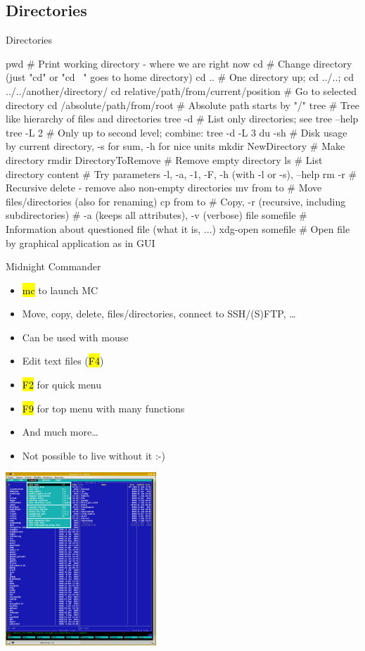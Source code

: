 \documentclass[compress, ucs, xelatex, 11pt, xcolor=svgnames,
  hyperref={
    bookmarks=true,
    unicode=true,
    colorlinks=true,
    pdftitle={Linux, command line and MetaCentrum},
    plainpages=false,
    pdfauthor={Vojtech Zeisek},
    pdfsubject={Course about use of Linux command line, writing shell scripts and using MetaCentrum of CESNET},
    pdfcreator={XeLaTeX},
    pdfkeywords={Linux, GNU, BASH, shell, command line, MetaCentrum},
    linkcolor=Red,
    anchorcolor=Blue,
    citecolor=Purple,
    filecolor=DodgerBlue,
    menucolor=DarkOrchid,
    urlcolor=DeepSkyBlue,
    pdftex},
  url={hyphens, lowtilde} %
  ]{beamer}
\renewcommand{\texttt}[1]{\hl{\ttfamily #1}}
\begin{document}
\subsection{Directories}

\begin{frame}[fragile]{Directories}
  \begin{bashcode}
    pwd # Print working directory - where we are right now
    cd # Change directory (just "cd" or "cd ~" goes to home directory)
    cd .. # One directory up; cd ../..; cd ../../another/directory/
    cd relative/path/from/current/position # Go to selected directory
    cd /absolute/path/from/root # Absolute path starts by "/"
    tree # Tree like hierarchy of files and directories
    tree -d # List only directories; see tree --help
    tree -L 2 # Only up to second level; combine: tree -d -L 3
    du -sh # Disk usage by current directory, -s for sum, -h for nice units
    mkdir NewDirectory # Make directory
    rmdir DirectoryToRemove # Remove empty directory
    ls # List directory content
       # Try parameters -l, -a, -1, -F, -h (with -l or -s), --help
    rm -r # Recursive delete - remove also non-empty directories
    mv from to # Move files/directories (also for renaming)
    cp from to # Copy, -r (recursive, including subdirectories)
               # -a (keeps all attributes), -v (verbose)
    file somefile # Information about questioned file (what it is, ...)
    xdg-open somefile # Open file by graphical application as in GUI
  \end{bashcode}
\end{frame}

\begin{frame}{Midnight Commander}
\begin{multicols}{2}
\begin{itemize}
  \item \texttt{mc} to launch MC
  \item Move, copy, delete, files/directories, connect to SSH/(S)FTP, \ldots
  \item Can be used with mouse
  \item Edit text files (\texttt{F4})
  \item \texttt{F2} for quick menu
  \item \texttt{F9} for top menu with many functions
  \item And much more\ldots
  \item Not possible to live without it :-)
\end{itemize}
\includegraphics[height=6.5cm]{mc.png}
\end{multicols}
\end{frame}
\end{document}
